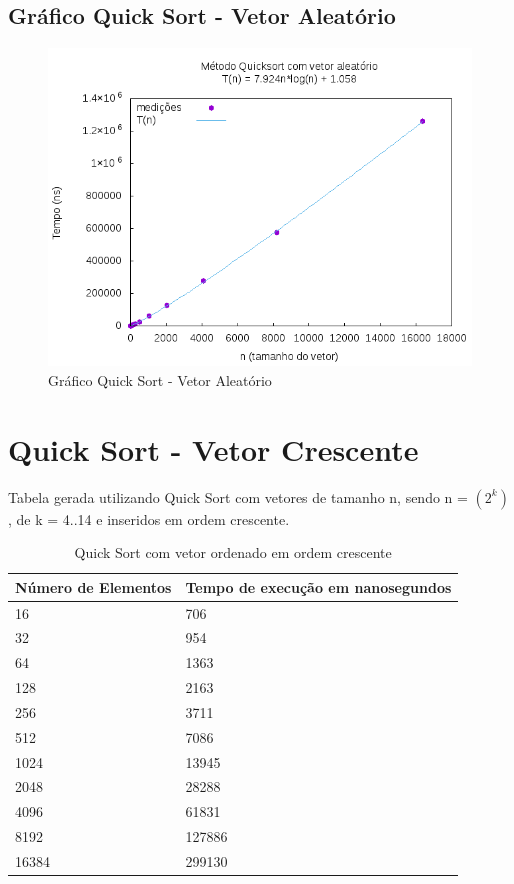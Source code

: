 \documentclass[12pt,a4paper,twoside]{report}
\begin{document}
\subsection{Gráfico Quick Sort - Vetor Aleatório}
\begin{figure}[H]
    \centering
    \includegraphics[width=0.7\linewidth]{graficos/QuickSort/vIntAleatorio/vIntAleatorio.png}
  \caption{Gráfico Quick Sort - Vetor Aleatório}
\end{figure}

\section{Quick Sort - Vetor Crescente}
Tabela gerada utilizando Quick Sort com vetores de tamanho n, sendo n = $(2^k)$, de k = 4..14 e inseridos em ordem crescente.
\begin{table}[H]
\centering
\caption{Quick Sort com vetor ordenado em ordem crescente}
\label{my-label}
\begin{tabular}{|l|l|}
\hline
\multicolumn{1}{|c|}{\textbf{Número de Elementos}} & \multicolumn{1}{c|}{\textbf{Tempo de execução em nanosegundos}} \\ \hline
16 & 706 \\ \hline
32 & 954 \\ \hline
64 & 1363 \\ \hline
128 & 2163 \\ \hline
256 & 3711 \\ \hline
512 & 7086 \\ \hline
1024 & 13945 \\ \hline
2048 & 28288 \\ \hline
4096 & 61831 \\ \hline
8192 & 127886 \\ \hline
16384 & 299130 \\ \hline
\end{tabular}
\end{table}
\end{document}
